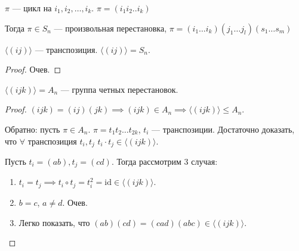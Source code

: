 \begin{definition}
    $\pi$ --- цикл на  $i_1, i_2, \ldots, i_k$. $\pi = (i_1 i_2..i_k)$
    
    Тогда $\pi \in S_n$ --- произвольная перестановка,  $\pi = (i_1 \ldots i_k)(j_1 \ldots j_l) (s_1 \ldots s_m)$
\end{definition}

\begin{theorem}
    $\langle (ij) \rangle$ --- транспозиция. $\langle (ij) \rangle = S_n$. 
\end{theorem}
\begin{proof}
    Очев.
\end{proof}
\begin{theorem}
    $\langle (ijk) \rangle = A_n$ --- группа четных перестановок. 
\end{theorem}
\begin{proof}
    $(ijk) = (ij)(jk) \implies (ijk) \in A_n \implies \langle (ijk) \rangle \le A_n$.

    Обратно: пусть $\pi \in A_n$.  $\pi = t_1t_2\ldots t_{2k}$, $t_i$ --- транспозиции. Достаточно доказать, что  $\forall $ транспозиция  $t_i, t_j$  $t_i \cdot t_j \in \langle (ijk)\rangle$.

    Пусть  $t_i = (ab), t_j = (cd)$. Тогда рассмотрим 3 случая:
     \begin{enumerate}
         \item $t_i = t_j \implies t_i \circ t_j = t_i^2 = \mathrm{id} \in \langle (ijk) \rangle$.
         \item  $b = c$,  $a \neq d$. Очев.
         \item Легко показать, что  $(ab)(cd) = (cad)(abc) \in \langle (ijk) \rangle$. 
    \end{enumerate}
\end{proof}

